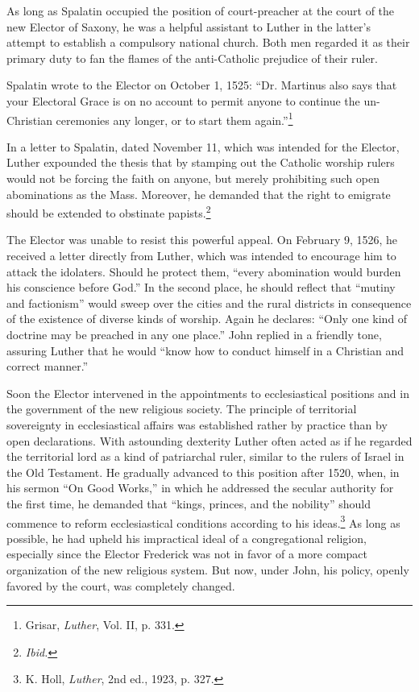 As long as Spalatin occupied the position of court-preacher at
the court of the new Elector of Saxony, he was a helpful assistant
to Luther in the latter’s attempt to establish a compulsory national
church. Both men regarded it as their primary duty to fan the
flames of the anti-Catholic prejudice of their ruler.

Spalatin wrote to the Elector on October 1, 1525: “Dr. Martinus also
says that your Electoral Grace is on no account to permit anyone to continue
the un-Christian ceremonies any longer, or to start them again.''\footnote{Grisar, \textit{Luther}, Vol. II, p. 331.}

In a letter to Spalatin, dated November 11, which was intended for the
Elector, Luther expounded the thesis that by stamping out the Catholic
worship rulers would not be forcing the faith on anyone, but merely
prohibiting such open abominations as the Mass. Moreover, he demanded that
the right to emigrate should be extended to obstinate papists.\footnote{\textit{Ibid.}}

The Elector was unable to resist this powerful appeal.
On February 9, 1526, he received a letter directly from Luther, which
was intended to encourage him to attack the idolaters. Should he protect
them, “every abomination would burden his conscience before God.” In the
second place, he should reflect that “mutiny and factionism” would sweep
over the cities and the rural districts in consequence of the existence of diverse
kinds of worship. Again he declares: “Only one kind of doctrine may be
preached in any one place.” John replied in a friendly tone, assuring Luther
that he would “know how to conduct himself in a Christian and correct
manner.”

Soon the Elector intervened in the appointments to ecclesiastical
positions and in the government of the new religious society. The
principle of territorial sovereignty in ecclesiastical affairs was established
rather by practice than by open declarations. With astounding
dexterity Luther often acted as if he regarded the territorial lord
as a kind of patriarchal ruler, similar to the rulers of Israel in the
Old Testament. He gradually advanced to this position after 1520,
when, in his sermon “On Good Works,” in which he addressed the
secular authority for the first time, he demanded that “kings, princes,
and the nobility” should commence to reform ecclesiastical conditions
according to his ideas.\footnote{K. Holl, \textit{Luther}, 2nd ed., 1923, p. 327.}
As long as possible, he had upheld
his impractical ideal of a congregational religion, especially since
the Elector Frederick was not in favor of a more compact organization
of the new religious system. But now, under John, his policy,
openly favored by the court, was completely changed.

